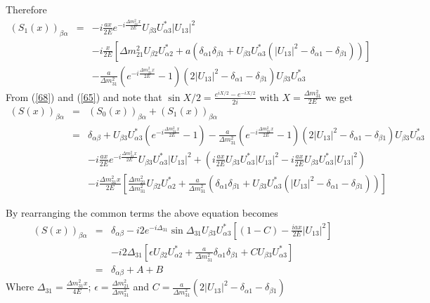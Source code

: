 \documentclass[a4 paper,12pt]{report}%
\begin{document}
Therefore
 \begin{eqnarray}\label{68} \nonumber
(S_1(x))_{\beta\alpha} &=& -i\frac{ax}{2E}e^{-i\frac{\Delta m^2_{31}x}{2E}}U_{\beta 3}U^*_{\alpha 3}|U_{13}|^2\\ \nonumber
&&-i\frac{x}{2E}\left[\Delta m^2_{21}U_{\beta 2}U^*_{\alpha 2}+a(\delta_{\alpha 1}\delta_{\beta 1}+U_{\beta 3}U^*_{\alpha 3}(|U_{13}|^2 -\delta_{\alpha 1}-\delta_{\beta 1}))\right]\\
&&-\frac{a}{\Delta m^2_{31}}\left(e^{-i\frac{\Delta m^2_{31}x}{2E}}-1\right)(2|U_{13}|^2 -\delta_{\alpha 1}-\delta_{\beta 1})U_{\beta 3}U^*_{\alpha 3}
\end{eqnarray}
From (\ref{68}) and (\ref{65}) and note that $\sin X/2 = \frac{e^{iX/2} - e^{-iX/2}}{2i}$ with $X = \frac{\Delta m^2_{31}}{2E}$ we get
 \begin{eqnarray} \nonumber
(S(x))_{\beta\alpha} &=&(S_0(x))_{\beta\alpha} +(S_1(x))_{\beta\alpha}\\ \nonumber
 &=&\delta_{\alpha\beta} + U_{\beta 3}U^*_{\alpha 3}\left(e^{-i\frac{\Delta m^2_{31}x}{2E}} - 1\right) -\frac{a}{\Delta m^2_{31}}\left(e^{-i\frac{\Delta m^2_{31}x}{2E}}-1\right)(2|U_{13}|^2 -\delta_{\alpha 1}-\delta_{\beta 1})U_{\beta 3}U^*_{\alpha 3} \\ \nonumber
&& -i\frac{ax}{2E}e^{-i\frac{\Delta m^2_{31}x}{2E}}U_{\beta 3}U^*_{\alpha 3}|U_{13}|^2 +\left(i\frac{ax}{2E}U_{\beta 3}U^*_{\alpha 3}|U_{13}|^2 -i\frac{ax}{2E}U_{\beta 3}U^*_{\alpha 3}|U_{13}|^2\right)\\ \nonumber
&&-i\frac{\Delta m^2_{31}x}{2E}\left[\frac{\Delta m^2_{21}}{\Delta m^2_{31}}U_{\beta 2}U^*_{\alpha 2}+\frac{a}{\Delta m^2_{31}}(\delta_{\alpha 1}\delta_{\beta 1}+U_{\beta 3}U^*_{\alpha 3}(|U_{13}|^2 -\delta_{\alpha 1}-\delta_{\beta 1}))\right]
\end{eqnarray}

By rearranging the common terms the above equation becomes
 \begin{eqnarray}\label{69} \nonumber
(S(x))_{\beta\alpha} &=&\delta_{\alpha\beta} -i2e^{-i\Delta_{31}}\sin\Delta_{31}U_{\beta 3}U^*_{\alpha 3}\left[(1-C)-\frac{iax}{2E}|U_{13}|^2\right]\\  \nonumber
&&-i2\Delta_{31}\left[\epsilon U_{\beta 2}U^*_{\alpha 2}+\frac{a}{\Delta m^2_{31}}\delta_{\alpha 1}\delta_{\beta 1}+CU_{\beta 3}U^*_{\alpha 3}\right] \\
&=& \delta_{\alpha\beta} + A + B
\end{eqnarray}
Where $\Delta_{31} = \frac{\Delta m^2_{31}x}{4E}$; $\epsilon = \frac{\Delta m^2_{21}}{\Delta m^2_{31}}$ and $C = \frac{a}{\Delta m^2_{31}}(2|U_{13}|^2-\delta_{\alpha 1}-\delta_{\beta 1})$\par
\end{document}
